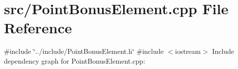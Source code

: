 \section{src/\-Point\-Bonus\-Element.cpp \-File \-Reference}
\label{_point_bonus_element_8cpp}
{\ttfamily \#include \char`\"{}../include/\-Point\-Bonus\-Element.\-h\char`\"{}}\*
{\ttfamily \#include $<$iostream$>$}\*
\-Include dependency graph for \-Point\-Bonus\-Element.\-cpp\-:
